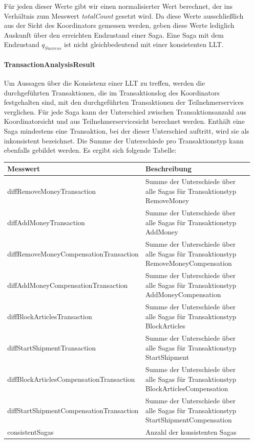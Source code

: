 Für jeden dieser Werte gibt wir einen normalisierter Wert berechnet, der ins Verhältnis zum Messwert \textit{totalCount} gesetzt wird. Da diese Werte ausschließlich aus der Sicht des Koordinators gemessen werden, geben diese Werte lediglich Auskunft über den erreichten Endzustand einer Saga. Eine Saga mit dem Endzustand $q_{Success}$ ist nicht gleichbedeutend mit einer konsistenten LLT. 

\paragraph*{TransactionAnalysisResult}
Um Aussagen über die Konsistenz einer LLT zu treffen, werden die durchgeführten Transaktionen, die im Transaktionslog des Koordinators festgehalten sind, mit den durchgeführten Transaktionen der Teilnehmerservices verglichen. Für jede Saga kann der Unterschied zwischen Transaktionsanzahl aus Koordinatorsicht und aus Teilnehmerservicesicht berechnet werden. Enthält eine Saga mindestens eine Transaktion, bei der dieser Unterschied auftritt, wird sie als inkonsistent bezeichnet. Die Summe der Unterschiede pro Transaktionstyp kann ebenfalls gebildet werden. Es ergibt sich folgende Tabelle:

\begin{center}
	\begin{longtable}[h]{|p{5cm}|p{12cm}|}
		\hline
		Messwert & Beschreibung \\ \hline
		diffRemoveMoney\-Transaction & Summe der Unterschiede über alle Sagas für Transaktionstyp RemoveMoney \\ \hline
		diffAddMoney\-Transaction & Summe der Unterschiede über alle Sagas für Transaktionstyp AddMoney \\ \hline
		diffRemoveMoney\-CompensationTransaction &  Summe der Unterschiede über alle Sagas für Transaktionstyp RemoveMoneyCompensation \\ \hline
		diffAddMoney\-CompensationTransaction &  Summe der Unterschiede über alle Sagas für Transaktionstyp AddMoneyCompensation \\ \hline
		diffBlockArticles\-Transaction &  Summe der Unterschiede über alle Sagas für Transaktionstyp BlockArticles \\ \hline
		diffStartShipment\-Transaction &  Summe der Unterschiede über alle Sagas für Transaktionstyp StartShipment \\ \hline
		diffBlockArticles\-CompensationTransaction &  Summe der Unterschiede über alle Sagas für Transaktionstyp BlockArticlesCompensation\\ \hline
		diffStartShipment\-CompensationTransaction &  Summe der Unterschiede über alle Sagas für Transaktionstyp StartShipmentCompensation\\ \hline
		consistentSagas & Anzahl der konsistenten Sagas \\ \hline	
	\end{longtable}
\end{center}
\FloatBarrier

